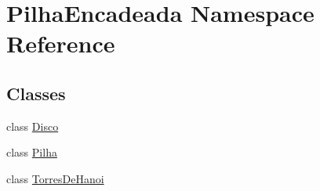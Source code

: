 \hypertarget{namespacePilhaEncadeada}{
\section{PilhaEncadeada Namespace Reference}
\label{namespacePilhaEncadeada}
}
\subsection*{Classes}
\begin{DoxyCompactItemize}
\item 
class \hyperlink{classPilhaEncadeada_1_1Disco}{Disco}
\item 
class \hyperlink{classPilhaEncadeada_1_1Pilha}{Pilha}
\item 
class \hyperlink{classPilhaEncadeada_1_1TorresDeHanoi}{TorresDeHanoi}
\end{DoxyCompactItemize}
